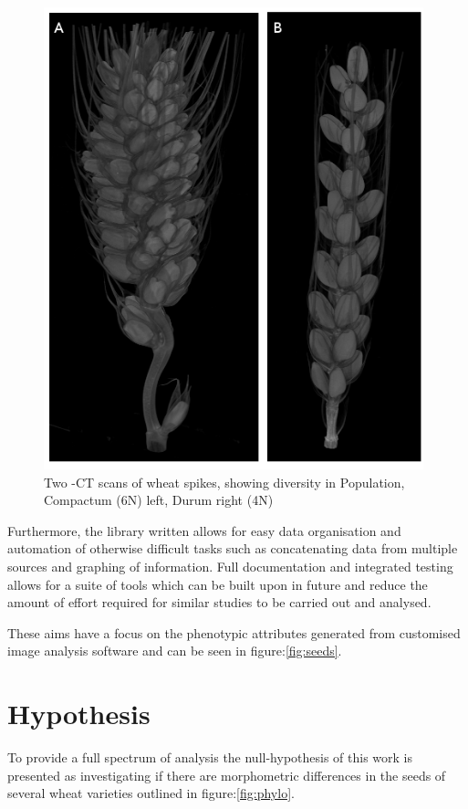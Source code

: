 \documentclass[11pt]{report}
\begin{document}
\begin{figure}[htb]
\centering
\includegraphics[width=11cm]{./images/spikes.png}
\caption{\label{fig:spikes}Two \textmu{}-CT scans of wheat spikes, showing diversity in Population, Compactum (6N) left, Durum right (4N)}
\end{figure}


Furthermore, the library written allows for easy data organisation and automation of otherwise difficult tasks such as concatenating data from multiple sources and graphing of information. Full documentation and integrated testing allows for a suite of tools which can be built upon in future and reduce the amount of effort required for similar studies to be carried out and analysed.

These aims have a focus on the phenotypic attributes generated from customised image analysis software \cite{Hughes2017} and can be seen in figure:\ref{fig:seeds}.

\section{Hypothesis}
\label{sec-1-5}
To provide a full spectrum of analysis the null-hypothesis of this work is presented as investigating if there are morphometric differences in the seeds of several wheat varieties outlined in figure:\ref{fig:phylo}.
\end{document}
